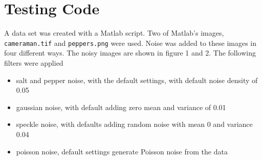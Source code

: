 \documentclass{article}
\begin{document}
\section{Testing Code}
A data set was created with a Matlab script. Two of Matlab's images,
\texttt{cameraman.tif} and \texttt{peppers.png} were used. Noise was
added to these images in four different ways. The noisy images are
shown in figure 1 and 2. The following filters
were applied
\begin{itemize}
  \item salt and pepper noise, with the default settings, with
  default noise density of 0.05
  \item gaussian noise, with default adding zero mean and variance
  of 0.01 
  \item speckle noise, with defaults adding random noise with mean 0
  and variance 0.04 
  \item poisson noise, default settings generate Poisson noise from
  the data
\end{itemize}
  
\end{document}
